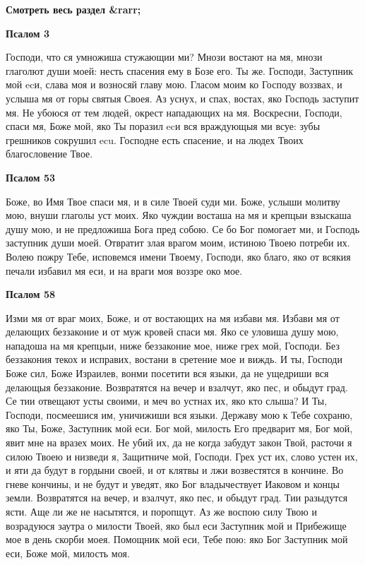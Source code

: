 


\bfseries Смотреть весь раздел &rarr;\normalfont{} 

 


\bfseries Псалом 3\normalfont{}


Господи, что ся умножиша стужающии ми? Мнози востают на мя, мнози глаголют души моей: несть спасения ему в Бозе его. Ты же. Господи, Заступник мой ecи, слава моя и возносяй главу мою. Гласом моим ко Господу воззвах, и услыша мя от горы святыя Своея. Аз уснух, и спах, востах, яко Господь заступит мя. Не убоюся от тем людей, окрест нападающих на мя. Воскресни, Господи, спаси мя, Боже мой, яко Ты поразил ecи вся враждующыя ми всуе: зубы грешников сокрушил ecu. Господне есть спасение, и на людех Твоих благословение Твое.


\medskip


\bfseries Псалом 53\normalfont{}


Боже, во Имя Твое спаси мя, и в силе Твоей суди ми. Боже, услыши молитву мою, внуши глаголы уст моих. Яко чуждии восташа на мя и крепцыи взыскаша душу мою, и не предложиша Бога пред собою. Се бо Бог помогает ми, и Господь заступник души моей. Отвратит злая врагом моим, истиною Твоею потреби их. Волею пожру Тебе, исповемся имени Твоему, Господи, яко благо, яко от всякия печали избавил мя еси, и на враги моя воззре око мое.


\medskip


\bfseries Псалом 58\normalfont{}


Изми мя от враг моих, Боже, и от востающих на мя избави мя. Избави мя от делающих беззаконие и от муж кровей спаси мя. Яко се уловиша душу мою, нападоша на мя крепцыи, ниже беззаконие мое, ниже грех мой, Господи. Без беззакония текох и исправих, востани в сретение мое и виждь. И ты, Господи Боже сил, Боже Израилев, вонми посетити вся языки, да не ущедриши вся делающыя беззаконие. Возвратятся на вечер и взалчут, яко пес, и обыдут град. Се тии отвещают усты своими, и меч во устнах их, яко кто слыша? И Ты, Господи, посмеешися им, уничижиши вся языки. Державу мою к Тебе сохраню, яко Ты, Боже, Заступник мой еси. Бог мой, милость Его предварит мя, Бог мой, явит мне на вразех моих. Не убий их, да не когда забудут закон Твой, расточи я силою Твоею и низведи я, Защитниче мой, Господи. Грех уст их, слово устен их, и яти да будут в гордыни своей, и от клятвы и лжи возвестятся в кончине. Во гневе кончины, и не будут и уведят, яко Бог владычествует Иаковом и концы земли. Возвратятся на вечер, и взалчут, яко пес, и обыдут град. Тии разыдутся ясти. Аще ли же не насытятся, и поропщут. Аз же воспою силу Твою и возрадуюся заутра о милости Твоей, яко был еси Заступник мой и Прибежище мое в день скорби моея. Помощник мой еси, Тебе пою: яко Бог Заступник мой еси, Боже мой, милость моя.


